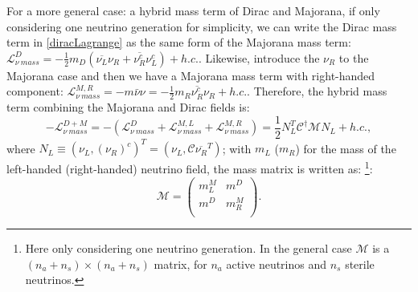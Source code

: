 For a more general case: a hybrid mass term of Dirac and Majorana, if only considering one neutrino generation for simplicity, we can write the Dirac mass term in \ref{diracLagrange} as the same form of the Majorana mass term: $\mathcal{L}_{\nu~mass}^D = -\frac{1}{2}m_D(\overline{\nu_L}\nu_R+\overline{\nu^c_R}\nu^c_L)+h.c.$. Likewise, introduce the $\nu_R$ to the Majorana case and then we have a Majorana mass term with right-handed component: $\mathcal{L}^{M,R}_{\nu~mass} = -m\bar{\nu}\nu=-\frac{1}{2}m_R\overline{\nu_R^c}\nu_R+h.c.$. Therefore, the hybrid mass term combining the Majorana and Dirac fields is\cite{akhmedov2014majorana,zuber1998physics}:
\begin{equation}\label{hybridmass}
-\mathcal{L}^{D+M}_{\nu~mass} = -(\mathcal{L}^{D}_{\nu~mass}+\mathcal{L}^{M,L}_{\nu~mass}+\mathcal{L}^{M,R}_{\nu~mass})=\frac{1}{2}N^T_L\mathcal{C}^\dagger
\mathcal{M}N_L+h.c.,
\end{equation}
where $N_L\equiv(\nu_L,(\nu_R)^c)^T=(\nu_L,\mathcal{C}\overline{\nu_R}^T)$; with $m_L$ ($m_R$) for the mass of the left-handed (right-handed) neutrino field, the mass matrix is written as:
\footnote{Here only considering one neutrino generation. In the general case $\mathcal M$ is a $(n_a+n_s)\times(n_a+n_s)$ matrix, for $n_a$ active neutrinos and $n_s$ sterile neutrinos\cite{akhmedov2014majorana,zuber1998physics}.}:
\begin{equation}
\mathcal M=
\begin{pmatrix}
	m_L^M &  m^D\\
	m^D &  m_R^M\\
\end{pmatrix}.
\end{equation}


